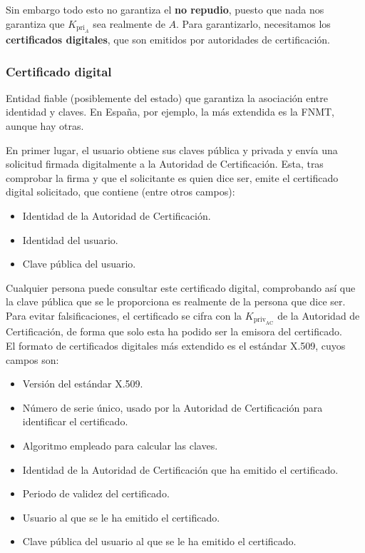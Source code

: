 Sin embargo todo esto no garantiza el \textbf{no repudio}, puesto que nada nos garantiza que $K_{\text{pri}_A}$ sea realmente de $A$. Para garantizarlo, necesitamos los \textbf{certificados digitales}, que son emitidos por autoridades de certificación.


\subsubsection{Certificado digital}

\begin{definicion}
    Entidad fiable (posiblemente del estado) que garantiza la asociación entre identidad y claves. En España, por ejemplo, la más extendida es la \acrshort{FNMT}, aunque hay otras.
\end{definicion}

En primer lugar, el usuario obtiene sus claves pública y privada y envía una solicitud firmada digitalmente a la Autoridad de Certificación. Esta, tras comprobar la firma y que el solicitante es quien dice ser, emite el certificado digital solicitado, que contiene (entre otros campos):
\begin{itemize}
    \item Identidad de la Autoridad de Certificación.
    \item Identidad del usuario.
    \item Clave pública del usuario.
\end{itemize}
Cualquier persona puede consultar este certificado digital, comprobando así que la clave pública que se le proporciona es realmente de la persona que dice ser. Para evitar falsificaciones, el certificado se cifra con la $K_{\text{priv}_\text{AC}}$ de la Autoridad de Certificación, de forma que solo esta ha podido ser la emisora del certificado.\\

El formato de certificados digitales más extendido es el estándar X.509, cuyos campos son:
\begin{itemize}
    \item Versión del estándar X.509.
    \item Número de serie único, usado por la Autoridad de Certificación para identificar el certificado.
    \item Algoritmo empleado para calcular las claves.
    \item Identidad de la Autoridad de Certificación que ha emitido el certificado.
    \item Periodo de validez del certificado.
    \item Usuario al que se le ha emitido el certificado.
    \item Clave pública del usuario al que se le ha emitido el certificado.
\end{itemize}

